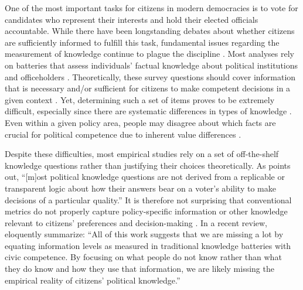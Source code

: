 
One of the most important tasks for citizens in modern democracies is to vote for candidates who represent their interests and hold their elected officials accountable. While there have been longstanding debates about whether citizens are sufficiently informed to fulfill this task, fundamental issues regarding the measurement of knowledge continue to plague the discipline \citep{mondak2001developing,sturgis2008experiment,pietryka2013analysis}. Most analyses rely on batteries that assess individuals' factual knowledge about political institutions and officeholders \citep[e.g.,][]{carpini1996americans}. Theoretically, these survey questions should cover information that is necessary and/or sufficient for citizens to make competent decisions in a given context \citep[c.f.,][]{lupia2006elitism,lupia2015uninformed}. Yet, determining such a set of items proves to be extremely difficult, especially since there are systematic differences in types of knowledge \citep{barabas2014question}. Even within a given policy area, people may disagree about which facts are crucial for political competence due to inherent value differences \citep{lupia2015uninformed}. 

Despite these difficulties, most empirical studies rely on a set of off-the-shelf knowledge questions rather than justifying their choices theoretically. As \citet[219]{lupia2006elitism} points out, ``[m]ost political knowledge questions are not derived from a replicable or transparent logic about how their answers bear on a voter's ability to make decisions of a particular quality.'' It is therefore not surprising that conventional metrics do not properly capture policy-specific information \citep[e.g.,][]{gilens2001political} or other knowledge relevant to citizens' preferences and decision-making \citep[c.f.,][43--68]{graber2001processing}. In a recent review, \citet[756]{cramer2017fact} eloquently summarize: ``All of this work suggests that we are missing a lot by equating information levels as measured in traditional knowledge batteries with civic competence. By focusing on what people do not know rather than what they do know and how they use that information, we are likely missing the empirical reality of citizens' political knowledge.'' 

